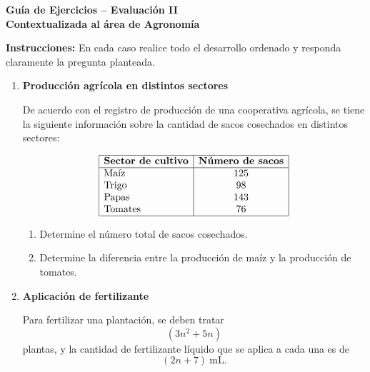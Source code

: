 \documentclass[12pt]{article}
\begin{document}
	
	\begin{center}
		{\Large \textbf{Guía de Ejercicios -- Evaluación II}}\\[0.3cm]
		{\large \textbf{Contextualizada al área de Agronomía}}
	\end{center}
	
	\vspace{0.4cm}
	
	\noindent
	\textbf{Instrucciones:} En cada caso realice todo el desarrollo ordenado y responda claramente la pregunta planteada.
	
	\vspace{0.5cm}
	
	\begin{enumerate}
		
		\item \textbf{Producción agrícola en distintos sectores}
		
		De acuerdo con el registro de producción de una cooperativa agrícola, se tiene la siguiente información sobre la cantidad de sacos cosechados en distintos sectores:
		
		\[
		\begin{array}{|l|c|}
			\hline
			\textbf{Sector de cultivo} & \textbf{Número de sacos} \\
			\hline
			\text{Maíz} & 125 \\
			\text{Trigo} & 98 \\
			\text{Papas} & 143 \\
			\text{Tomates} & 76 \\
			\hline
		\end{array}
		\]
		
		\begin{enumerate}[label=\alph*)]
			\item Determine el número total de sacos cosechados.
			\item Determine la diferencia entre la producción de maíz y la producción de tomates.
		\end{enumerate}
		
		\vspace{0.4cm}
		
		\item \textbf{Aplicación de fertilizante}
		
		Para fertilizar una plantación, se deben tratar 
		\[
		(3n^2+5n)
		\]
		plantas, y la cantidad de fertilizante líquido que se aplica a cada una es de
		\[
		(2n+7)\ \text{mL}.
		\]
		

\end{enumerate}
\end{document}
